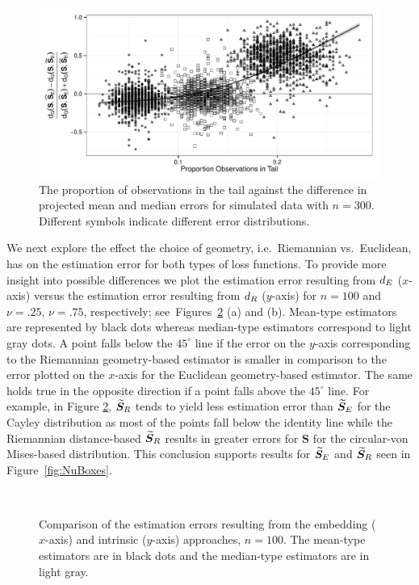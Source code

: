 \begin{figure}[h!]
\centering
\includegraphics[width=.8\textwidth]{Nu75N300TailBehaviorStandard}
\caption{The proportion of observations in the tail against the difference in projected mean and median errors for simulated data with $n=300$.  Different symbols indicate different error distributions.}
\label{fig:SimTail}
\end{figure}

We next explore the effect the choice of geometry, i.e.~Riemannian vs.~Euclidean, has on the estimation error for both types of loss functions. To provide more insight into possible differences we plot the estimation error resulting from ${d_E}$ ($x$-axis) versus the estimation error resulting from ${d_R}$ ($y$-axis) for $n=100$ and $\nu=.25$,  $\nu=.75$, respectively; see~Figures~\ref{fig:comPL2} (a) and (b).   
Mean-type estimators are represented by black dots whereas median-type estimators correspond to light gray dots. A point falls below the $45^\circ{}$ line if the error on the $y$-axis corresponding to the Riemannian geometry-based estimator is smaller in comparison to the error plotted on the $x$-axis for the Euclidean geometry-based estimator.  The same holds true in the opposite direction if a point falls above the $45^\circ{}$ line. 
For example, in Figure \ref{fig:comPL2},  ${\widetilde{\bm S}_R}$ tends to yield less estimation error than ${\widetilde{\bm S}_E}$  for the Cayley distribution as most of the points fall below the identity line while the Riemannian distance-based ${\widetilde{\bm S}_R}$ results in greater errors for ${\bm S}$ for the circular-von Mises-based distribution.  This conclusion supports results for ${\widetilde{\bm S}_E}$ and ${\widetilde{\bm S}_R}$ seen in Figure~\ref{fig:NuBoxes}.

\begin{figure}[h!]
\centering
{}\\
\caption{Comparison of the estimation errors resulting from the embedding ($x$-axis) and intrinsic ($y$-axis) approaches, $n=100$.  The mean-type estimators are in black dots and the median-type estimators are in light gray.}
\label{fig:comPL2}
\end{figure}

